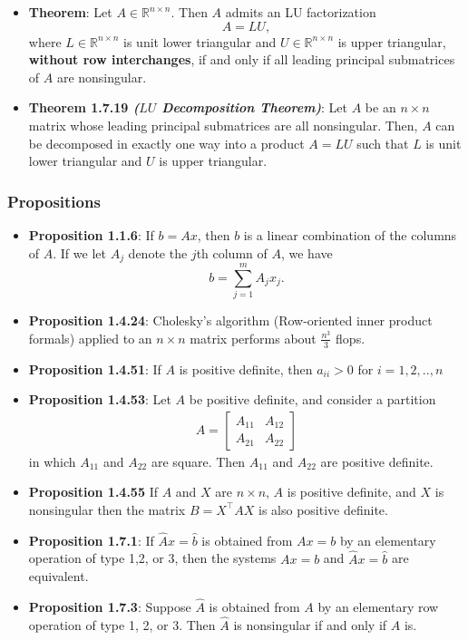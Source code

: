 \documentclass{report}
\begin{document}
\begin{itemize}
    \item \textbf{Theorem}: Let $A \in \mathbb{R}^{n \times n}$. Then $A$ admits an LU factorization
            \[
                A = LU,
            \]
            where $L \in \mathbb{R}^{n \times n}$ is unit lower triangular and 
            $U \in \mathbb{R}^{n \times n}$ is upper triangular, 
            \textbf{without row interchanges}, if and only if all leading principal 
            submatrices of $A$ are nonsingular.
    \item \textbf{Theorem 1.7.19 \textit{($LU$ Decomposition Theorem)}}: Let $A$ be an $n\times n$ matrix whose leading principal submatrices are all nonsingular. Then, $A$ can be decomposed in exactly one way into a product $A = LU$ such that $L$ is unit lower triangular and $U$ is upper triangular.


    \end{itemize}

    \pagebreak \bigbreak \noindent 
    \subsubsection{Propositions}
    \begin{itemize}
        \item \textbf{Proposition 1.1.6}: If $b = Ax$, then $b$ is a linear combination of the columns of $A$.
            \bigbreak \noindent 
            If we let $A_{j}$ denote the $j$th column of $A$, we have
            \[
                b = \sum_{j=1}^{m} A_{j} x_{j}.
            \]
        \item \textbf{Proposition 1.4.24}: Cholesky's algorithm (Row-oriented inner product formals) applied to an $n \times n$ matrix performs about $\frac{n^{3}}{3} $ flops.
        \item \textbf{Proposition 1.4.51}: If $A$ is positive definite, then $a_{ii} > 0$ for $i = 1,2,..,n$
        \item  \textbf{Proposition 1.4.53}: Let $A$ be positive definite, and consider a partition
            \begin{align*}
                A = \begin{bmatrix} A_{11} & A_{12} \\ A_{21} & A_{22} \end{bmatrix}
            \end{align*}
            in which $A_{11}$ and $A_{22} $ are square. Then $A_{11}$ and $A_{22}$ are positive definite.
        \item \textbf{Proposition 1.4.55} If $A$ and $X$ are $n\times n$, $A$ is positive definite, and $X$ is nonsingular then the matrix $B = X^{\top}AX$ is also positive definite.
        \item \textbf{Proposition 1.7.1}: If $\hat{A}x = \hat{b}$ is obtained from $Ax = b$ by an elementary operation of type 1,2, or 3, then the systems $Ax = b$ and $\hat{A}x = \hat{b}$ are equivalent.
        \item \textbf{Proposition 1.7.3}:  Suppose $\hat{A}$ is obtained from $A$ by an elementary row operation of
            type 1, 2, or 3. Then $\hat{A}$ is nonsingular if and only if $A$ is.
    \end{itemize}
\end{document}
